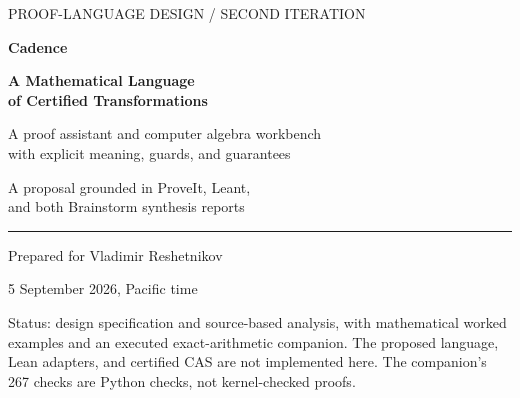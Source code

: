 \documentclass[11pt,letterpaper]{article}
\theoremstyle{definition}
\begin{document}
\begin{titlepage}
\color{ink}
{\sffamily\large PROOF-LANGUAGE DESIGN \quad / \quad SECOND ITERATION\par}
\vspace{1.05in}
{\sffamily\bfseries\fontsize{37}{42}\selectfont Cadence\par}
\vspace{.20in}
{\sffamily\bfseries\fontsize{25}{30}\selectfont A Mathematical Language\\of Certified Transformations\par}
\vspace{.32in}
{\sffamily\Large A proof assistant and computer algebra workbench\\with explicit meaning, guards, and guarantees\par}
\vspace{.55in}
{\large A proposal grounded in ProveIt, Leant,\\and both Brainstorm synthesis reports\par}
\vfill
\rule{\textwidth}{.8pt}
\vspace{.15in}
Prepared for Vladimir Reshetnikov\par
5 September 2026, Pacific time\par
\vspace{.2in}
{\small\color{muted}
Status: design specification and source-based analysis, with mathematical
worked examples and an executed exact-arithmetic companion. The proposed
language, Lean adapters, and certified CAS are not implemented here.
The companion's 267 checks are Python checks, not kernel-checked proofs.
}
\end{titlepage}
\end{document}
